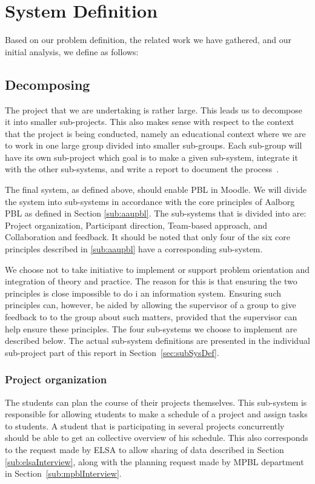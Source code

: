 \section{System Definition}
\label{sec:systemDef}
Based on our problem definition, the related work we have gathered, and our initial analysis, we define \system as follows:


\subsection{Decomposing \system}
\label{sub:decomposingSys}
The project that we are undertaking is rather large.
This leads us to decompose it into smaller sub-projects.
This also makes sense with respect to the context that the project is being conducted, namely an educational context where we are to work in one large group divided into smaller sub-groups.
Each sub-group will have its own sub-project which goal is to make a given sub-system, integrate it with the other sub-systems, and write a report to document the process~\cite{sw6studieordning}.

The final system, as defined above, should enable PBL in Moodle.
We will divide the system into sub-systems in accordance with the core principles of Aalborg PBL as defined in Section \ref{sub:aaupbl}.
The sub-systems that \system{} is divided into are:
Project organization,
Participant direction,
Team-based approach, and
Collaboration and feedback.
It should be noted that only four of the six core principles described in \ref{sub:aaupbl} have a corresponding sub-system.


We choose not to take initiative to implement or support problem orientation and integration of theory and practice.
The reason for this is that ensuring the two principles is close impossible to do i an information system.
Ensuring such principles can, however, be aided by allowing the supervisor of a group to give feedback to to the group about such matters, provided that the supervisor can help ensure these principles.
The four sub-systems we choose to implement are described below.
The actual sub-system definitions are presented in the individual sub-project part of this report in Section~\ref{sec:subSysDef}. 

\subsubsection{Project organization}
The students can plan the course of their projects themselves.
This sub-system is responsible for allowing students to make a schedule of a project and assign tasks to students.
A student that is participating in several projects concurrently should be able to get an collective overview of his schedule.
This also corresponds to the request made by ELSA to allow sharing of data described in Section \ref{sub:elsaInterview}, along with the planning request made by MPBL department in Section~\ref{sub:mpblInterview}.

